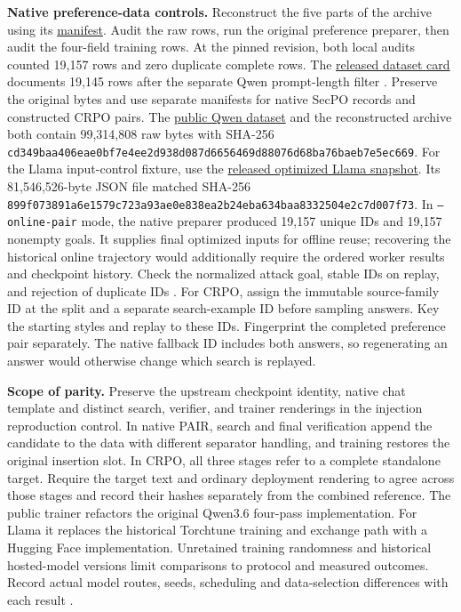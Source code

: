 \documentclass[11pt]{article}
\begin{document}
\textbf{Native preference-data controls.} Reconstruct the five parts of the archive using its \href{https://github.com/Sizhe-Chen/SecPO/blob/da0372a0e598badf4e51c98c175a962147cac2ac/data/qwen36_offline_dataset/manifest.json}{manifest}. Audit the raw rows, run the original preference preparer, then audit the four-field training rows. At the pinned revision, both local audits counted 19,157 rows and zero duplicate complete rows. The \href{https://github.com/Sizhe-Chen/SecPO/blob/da0372a0e598badf4e51c98c175a962147cac2ac/data/DATASET_CARD.md}{released dataset card} documents 19,145 rows after the separate Qwen prompt-length filter \cite{secpocode}. Preserve the original bytes and use separate manifests for native SecPO records and constructed CRPO pairs. The \href{https://huggingface.co/datasets/Sizhe-Chen/Qwen3.6-27B-Instruct-SecPO-trainset/blob/0cbfd6e6a2c2966dbccf4fa89b6ea7fe20c8703e/README.md}{public Qwen dataset} and the reconstructed archive both contain 99,314,808 raw bytes with SHA-256 \nolinkurl{cd349baa406eae0bf7e4ee2d938d087d6656469d88076d68ba76baeb7e5ec669}. For the Llama input-control fixture, use the \href{https://huggingface.co/datasets/Sizhe-Chen/Llama-3.1-8B-Instruct-SecPO-trainset/blob/f347c3abe1f451e88b02918c6bc3921e6816d8c6/README.md}{released optimized Llama snapshot}. Its 81,546,526-byte JSON file matched SHA-256 \nolinkurl{899f073891a6e1579c723a93ae0e838ea2b24eba634baa8332504e2c7d007f73}. In \texttt{--online-pair} mode, the native preparer produced 19,157 unique IDs and 19,157 nonempty goals. It supplies final optimized inputs for offline reuse; recovering the historical online trajectory would additionally require the ordered worker results and checkpoint history. Check the normalized attack goal, stable IDs on replay, and rejection of duplicate IDs \cite{secpocode}. For CRPO, assign the immutable source-family ID at the split and a separate search-example ID before sampling answers. Key the starting styles and replay to these IDs. Fingerprint the completed preference pair separately. The native fallback ID includes both answers, so regenerating an answer would otherwise change which search is replayed.

\textbf{Scope of parity.} Preserve the upstream checkpoint identity, native chat template and distinct search, verifier, and trainer renderings in the injection reproduction control. In native PAIR, search and final verification append the candidate to the data with different separator handling, and training restores the original insertion slot. In CRPO, all three stages refer to a complete standalone target. Require the target text and ordinary deployment rendering to agree across those stages and record their hashes separately from the combined reference. The public trainer refactors the original Qwen3.6 four-pass implementation. For Llama it replaces the historical Torchtune training and exchange path with a Hugging Face implementation. Unretained training randomness and historical hosted-model versions limit comparisons to protocol and measured outcomes. Record actual model routes, seeds, scheduling and data-selection differences with each result \cite{secpocode}.
\end{document}
